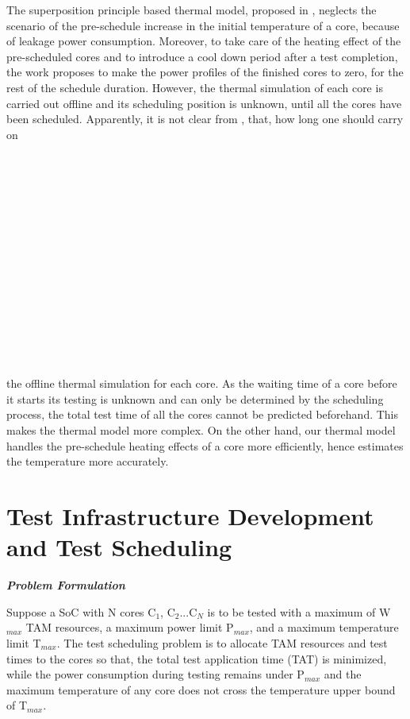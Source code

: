 \documentclass[conference]{IEEEtran}
\begin{document}
	\par
	The superposition principle based thermal model, proposed
in \cite{yao2011power}, neglects the scenario of the pre-schedule increase in
the initial temperature of a core, because of leakage power
consumption. Moreover, to take care of the heating effect of
the pre-scheduled cores and to introduce a cool down period
after a test completion, the work \cite{yao2011power} proposes to make the
power profiles of the finished cores to zero, for the rest of
the schedule duration. However, the thermal simulation of
each core is carried out offline and its scheduling position is
unknown, until all the cores have been scheduled. Apparently,
it is not clear from \cite{yao2011power}, that, how long one should carry on \\\\\\\\\\\\\\\\\\\\\\\\\\\\\\\\ the
offline thermal simulation for each core. As the waiting time
of a core before it starts its testing is unknown and can only
be determined by the scheduling process, the total test time of
all the cores cannot be predicted beforehand. This makes the
thermal model more complex. On the other hand, our thermal
model handles the pre-schedule heating effects of a core more
efficiently, hence estimates the temperature more accurately.\\




	\section{Test Infrastructure Development and Test
Scheduling}

	\textbf{\textit{Problem Formulation}}\\
	
	\par
	Suppose a SoC with N cores C$_{1}$, C$_{2}$...C$_{N}$ is to be tested
with a maximum of W$_{max}$ TAM resources, a maximum power
limit P$_{max}$, and a maximum temperature limit T$_{max}$. The
test scheduling problem is to allocate TAM resources and test
times to the cores so that, the total test application time (TAT)
is minimized, while the power consumption during testing
remains under P$_{max}$ and the maximum temperature of any
core does not cross the temperature upper bound of T$_{max}$.\\
\end{document}
